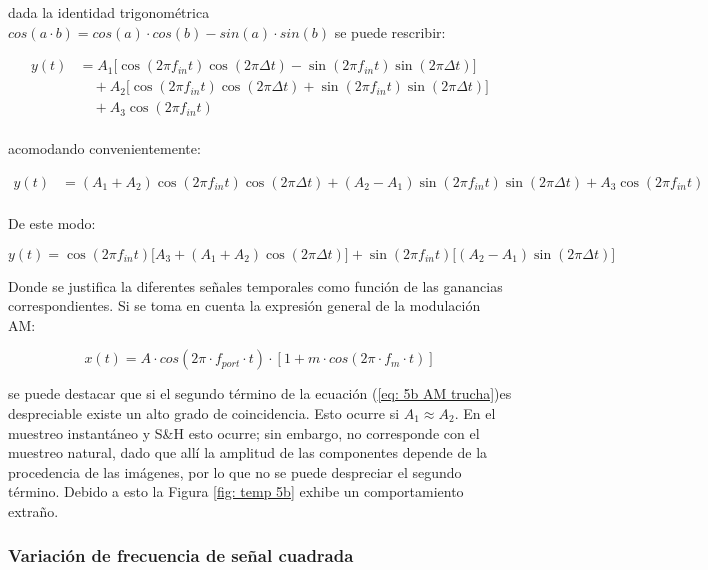 \noindent dada la identidad trigonométrica $cos(a\cdot b) = cos(a) \cdot cos(b) - sin(a) \cdot sin(b)$ se puede rescribir:

\begin{align*}
    y(t) &= A_1 \big[\cos(2\pi f_{in} t)\cos(2\pi \Delta t) - \sin(2\pi f_{in} t)\sin(2\pi \Delta t)\big] \\  
    &\quad + A_2 \big[\cos(2\pi f_{in} t)\cos(2\pi \Delta t) + \sin(2\pi f_{in} t)\sin(2\pi \Delta t)\big] \\
&\quad + A_3 \cos(2\pi f_{in} t) \\[6pt]
\end{align*}

\noindent acomodando convenientemente:


\begin{align*}
y(t) &= (A_1 + A_2)\cos(2\pi f_{in} t)\cos(2\pi \Delta t) + (A_2 - A_1)\sin(2\pi f_{in} t)\sin(2\pi \Delta t) + A_3 \cos(2\pi f_{in} t) \\[6pt]
\end{align*}

\noindent De este modo:

\begin{equation}\label{eq: 5b AM trucha}
    y(t)= \cos(2\pi f_{in} t)\big[A_3 + (A_1 + A_2)\cos(2\pi \Delta t)\big] + \sin(2\pi f_{in} t)\big[(A_2 - A_1)\sin(2\pi \Delta t)\big]
\end{equation}

\noindent Donde se justifica la diferentes señales temporales como función de las ganancias correspondientes. Si se toma en cuenta la expresión general de la modulación AM:

\begin{equation}
    x(t) = A \cdot cos(2\pi\cdot  f_{port} \cdot  t) \cdot [ 1+ m \cdot cos(2\pi \cdot f_{m} \cdot t )]
\end{equation}

\noindent se puede destacar que si el segundo término de la ecuación (\ref{eq: 5b AM trucha})es despreciable existe un alto grado de coincidencia. Esto ocurre si $A_1 \approx A_2$. En el muestreo instantáneo y S\&H esto ocurre; sin embargo, no corresponde con el muestreo natural, dado que allí la amplitud de las componentes depende de la procedencia de las imágenes, por lo que no se puede despreciar el segundo término. Debido a esto la Figura \ref{fig: temp 5b} exhibe un comportamiento extraño.

\subsubsection{Variación de frecuencia de señal cuadrada}

